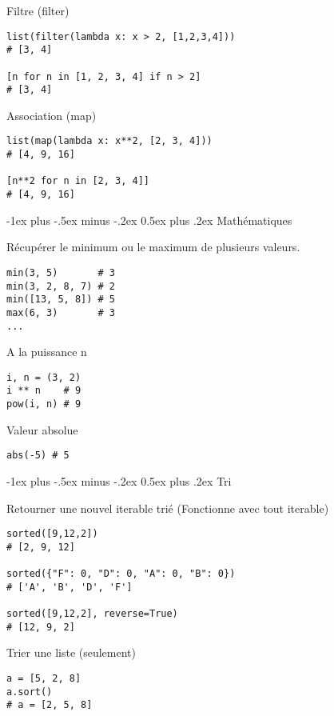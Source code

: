 \documentclass[10pt,landscape]{article}
\makeatletter
\renewcommand{\section}{\@startsection{section}{1}{0mm}%
                                {-1ex plus -.5ex minus -.2ex}%
                                {0.5ex plus .2ex}%
                                {\normalfont\large\bfseries}}
\makeatother
\begin{document}
\begin{multicols}{3}
Filtre (filter)
\begin{verbatim}
list(filter(lambda x: x > 2, [1,2,3,4]))
# [3, 4]

[n for n in [1, 2, 3, 4] if n > 2]
# [3, 4]
\end{verbatim}

Association (map)
\begin{verbatim}
list(map(lambda x: x**2, [2, 3, 4]))
# [4, 9, 16]

[n**2 for n in [2, 3, 4]]
# [4, 9, 16]
\end{verbatim}

\section{Mathématiques}

Récupérer le minimum ou le maximum de plusieurs valeurs.
\begin{verbatim}
min(3, 5)       # 3
min(3, 2, 8, 7) # 2
min([13, 5, 8]) # 5
max(6, 3)       # 3
...
\end{verbatim}

A la puissance n
\begin{verbatim}
i, n = (3, 2)
i ** n    # 9
pow(i, n) # 9
\end{verbatim}

Valeur absolue
\begin{verbatim}
abs(-5) # 5
\end{verbatim}

\section{Tri}

Retourner une nouvel iterable trié
(Fonctionne avec tout iterable)
\begin{verbatim}
sorted([9,12,2])
# [2, 9, 12]

sorted({"F": 0, "D": 0, "A": 0, "B": 0})
# ['A', 'B', 'D', 'F']

sorted([9,12,2], reverse=True)
# [12, 9, 2]
\end{verbatim}

Trier une liste (seulement)
\begin{verbatim}
a = [5, 2, 8]
a.sort()
# a = [2, 5, 8]
\end{verbatim}



\end{multicols}
\end{document}
